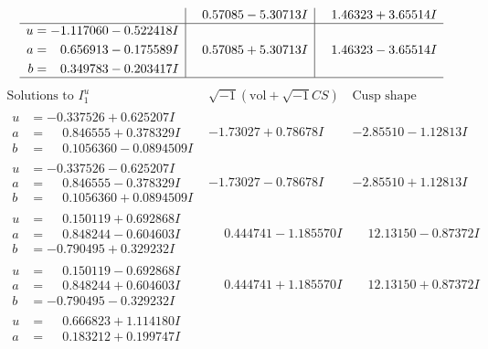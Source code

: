 \documentclass[1p]{elsarticle_modified}
\theoremstyle{definition}
\newcommand{\I}{\sqrt{-1}}
\begin{document}
$$\begin{array}{c|c|c}
 & \phantom{-}0.57085 - 5.30713 I & \phantom{-}1.46323 + 3.65514 I \\ \hline\begin{aligned}
u &= -1.117060 - 0.522418 I \\
a &= \phantom{-}0.656913 - 0.175589 I \\
b &= \phantom{-}0.349783 - 0.203417 I\end{aligned}
 & \phantom{-}0.57085 + 5.30713 I & \phantom{-}1.46323 - 3.65514 I\\
 \hline 
 \end{array}$$\newpage$$\begin{array}{c|c|c}  
\text{Solutions to }I^u_{1}& \I (\text{vol} + \sqrt{-1}CS) & \text{Cusp shape}\\
 \hline 
\begin{aligned}
u &= -0.337526 + 0.625207 I \\
a &= \phantom{-}0.846555 + 0.378329 I \\
b &= \phantom{-}0.1056360 - 0.0894509 I\end{aligned}
 & -1.73027 + 0.78678 I & -2.85510 - 1.12813 I \\ \hline\begin{aligned}
u &= -0.337526 - 0.625207 I \\
a &= \phantom{-}0.846555 - 0.378329 I \\
b &= \phantom{-}0.1056360 + 0.0894509 I\end{aligned}
 & -1.73027 - 0.78678 I & -2.85510 + 1.12813 I \\ \hline\begin{aligned}
u &= \phantom{-}0.150119 + 0.692868 I \\
a &= \phantom{-}0.848244 - 0.604603 I \\
b &= -0.790495 + 0.329232 I\end{aligned}
 & \phantom{-}0.444741 - 1.185570 I & \phantom{-}12.13150 - 0.87372 I \\ \hline\begin{aligned}
u &= \phantom{-}0.150119 - 0.692868 I \\
a &= \phantom{-}0.848244 + 0.604603 I \\
b &= -0.790495 - 0.329232 I\end{aligned}
 & \phantom{-}0.444741 + 1.185570 I & \phantom{-}12.13150 + 0.87372 I \\ \hline\begin{aligned}
u &= \phantom{-}0.666823 + 1.114180 I \\
a &= \phantom{-}0.183212 + 0.199747 I \\

\end{aligned}
\end{array}$$
\end{document}
